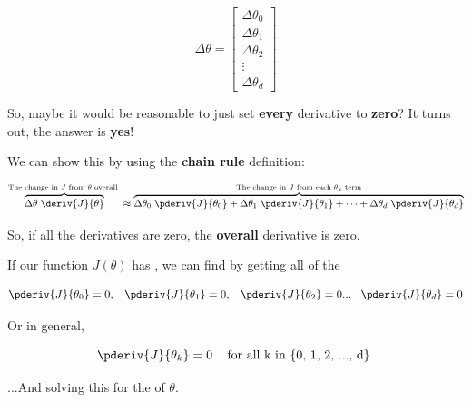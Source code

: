         \begin{equation}
            \Delta \theta =
            \begin{bmatrix}
                \Delta \theta_0 \\ \Delta \theta_1 \\ \Delta \theta_2 \\ \vdots \\ \Delta \theta_d
            \end{bmatrix}
        \end{equation}
        
        So, maybe it would be reasonable to just set \textbf{every} derivative to \textbf{zero}? It turns out, the answer is \textbf{yes}! 
        
        We can show this by using the \textbf{chain rule} definition:
        
        \begin{equation}
            \overbrace{
                \Delta \theta \; \deriv{J}{\theta}} 
            ^{\text{The change in $J$ from $\theta$ overall } }
            \approx 
            \overbrace{
                \Delta \theta_0 \; \pderiv{J}{\theta_0} + \Delta \theta_1 \; \pderiv{J}{\theta_1} + \dots + \Delta \theta_d \; \pderiv{J}{\theta_d}
            }^{\text{The change in $J$ from each $\theta_k$ term} }
        \end{equation}
        
        So, if all the derivatives are zero, the \textbf{overall} derivative is zero.
        \\
        
        \begin{concept}
            If our function $J(\theta)$ has   , we can  find  by getting all of the 
            
            \begin{equation*}
                \pderiv{J}{\theta_0} = 0, \;\;\;
                \pderiv{J}{\theta_1} = 0, \;\;\;
                \pderiv{J}{\theta_2} = 0... \;\;\;
                \pderiv{J}{\theta_d} = 0
            \end{equation*}
            
            Or in general, 
            
            \begin{equation*}
                \pderiv{J}{\theta_k} = 0 \;\;\; \text{ for all k in \{0, 1, 2, ..., d\} }
            \end{equation*}
            
            ...And solving this  for the  of $\theta$.
            
        \end{concept}
        
